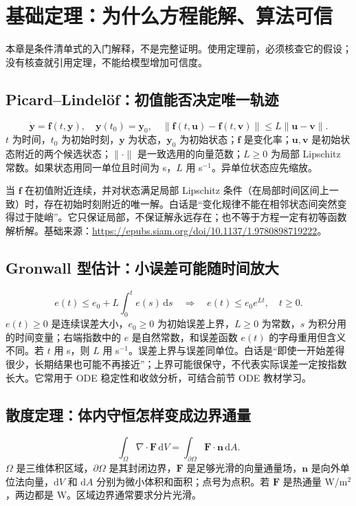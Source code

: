 \chapter{基础定理：为什么方程能解、算法可信}
本章是条件清单式的入门解释，不是完整证明。使用定理前，必须核查它的假设；没有核查就引用定理，不能给模型增加可信度。
\section{Picard--Lindelöf：初值能否决定唯一轨迹}
\begin{equation}\dot{\boldsymbol y}=\boldsymbol f(t,\boldsymbol y),\quad\boldsymbol y(t_0)=\boldsymbol y_0,\quad \|\boldsymbol f(t,\boldsymbol u)-\boldsymbol f(t,\boldsymbol v)\|\le L\|\boldsymbol u-\boldsymbol v\|.\end{equation}
$t$ 为时间，$t_0$ 为初始时刻，$\boldsymbol y$ 为状态，$\boldsymbol y_0$ 为初始状态；$\boldsymbol f$ 是变化率；$\boldsymbol u,\boldsymbol v$ 是初始状态附近的两个候选状态；$\|\cdot\|$ 是一致选用的向量范数；$L\ge0$ 为局部 Lipschitz 常数。如果状态用同一单位且时间为 s，$L$ 用 s$^{-1}$。异单位状态应先缩放。

当 $\boldsymbol f$ 在初值附近连续，并对状态满足局部 Lipschitz 条件（在局部时间区间上一致）时，存在初始时刻附近的唯一解。白话是“变化规律不能在相邻状态间突然变得过于陡峭”。它只保证局部，不保证解永远存在；也不等于方程一定有初等函数解析解。基础来源：\url{https://epubs.siam.org/doi/10.1137/1.9780898719222}。

\section{Gronwall 型估计：小误差可能随时间放大}
\begin{equation}e(t)\le e_0+L\int_0^t e(s)\,\mathrm ds\quad\Longrightarrow\quad e(t)\le e_0e^{Lt},\quad t\ge0.\end{equation}
$e(t)\ge0$ 是连续误差大小，$e_0\ge0$ 为初始误差上界，$L\ge0$ 为常数，$s$ 为积分用的时间变量；右端指数中的 $e$ 是自然常数，和误差函数 $e(t)$ 的字母重用但含义不同。若 $t$ 用 s，则 $L$ 用 s$^{-1}$。误差上界与误差同单位。白话是“即使一开始差得很少，长期结果也可能不再接近”；上界可能很保守，不代表实际误差一定按指数长大。它常用于 ODE 稳定性和收敛分析，可结合前节 ODE 教材学习。

\section{散度定理：体内守恒怎样变成边界通量}
\begin{equation}\int_\Omega\nabla\cdot\boldsymbol F\,\mathrm dV=\int_{\partial\Omega}\boldsymbol F\cdot\boldsymbol n\,\mathrm dA.\end{equation}
$\Omega$ 是三维体积区域，$\partial\Omega$ 是其封闭边界，$\boldsymbol F$ 是足够光滑的向量通量场，$\boldsymbol n$ 是向外单位法向量，$\mathrm dV$ 和 $\mathrm dA$ 分别为微小体积和面积；点号为点积。若 $\boldsymbol F$ 是热通量 W/m$^2$，两边都是 W。区域边界通常要求分片光滑。

